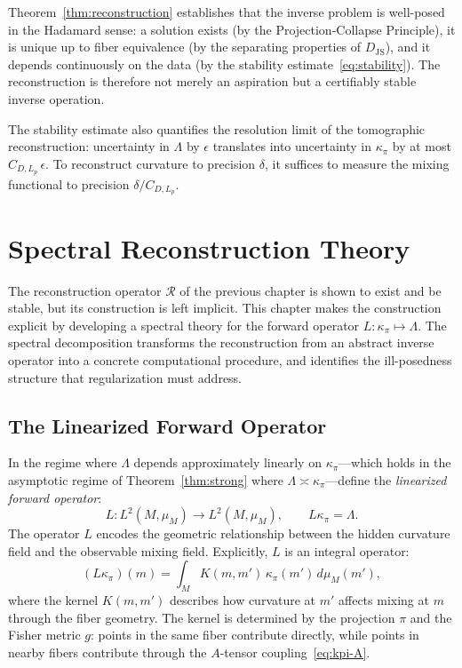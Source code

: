 \documentclass[12pt, oneside]{book}
\theoremstyle{plain-flyxion}
\theoremstyle{definition-flyxion}
\newcommand{\kpi}{\kappa_{\pi}}
\newcommand{\Lam}{\Lambda}
\begin{document}
Theorem~\ref{thm:reconstruction} establishes that the inverse problem is well-posed in
the Hadamard sense: a solution exists (by the Projection-Collapse Principle), it is
unique up to fiber equivalence (by the separating properties of $D_{\mathrm{JS}}$), and
it depends continuously on the data (by the stability estimate~\eqref{eq:stability}).
The reconstruction is therefore not merely an aspiration but a certifiably stable inverse
operation.

The stability estimate also quantifies the resolution limit of the tomographic
reconstruction: uncertainty in $\Lam$ by $\epsilon$ translates into uncertainty in $\kpi$
by at most $C_{D,L_p}\,\epsilon$. To reconstruct curvature to precision $\delta$, it
suffices to measure the mixing functional to precision $\delta / C_{D,L_p}$.

\chapter{Spectral Reconstruction Theory}

The reconstruction operator $\mathcal{R}$ of the previous chapter is shown to exist and
be stable, but its construction is left implicit. This chapter makes the construction
explicit by developing a spectral theory for the forward operator $L: \kpi \mapsto \Lam$.
The spectral decomposition transforms the reconstruction from an abstract inverse operator
into a concrete computational procedure, and identifies the ill-posedness structure that
regularization must address.

\section{The Linearized Forward Operator}

In the regime where $\Lam$ depends approximately linearly on $\kpi$---which holds in the
asymptotic regime of Theorem~\ref{thm:strong} where $\Lam \asymp \kpi$---define the
\emph{linearized forward operator}:
\begin{equation}\label{eq:forward-op}
L: L^2(M, \mu_M) \to L^2(M, \mu_M), \qquad L\kpi = \Lam.
\end{equation}
The operator $L$ encodes the geometric relationship between the hidden curvature field
and the observable mixing field. Explicitly, $L$ is an integral operator:
\begin{equation}\label{eq:forward-kernel}
(L\kpi)(m) = \int_M K(m, m')\, \kpi(m')\, d\mu_M(m'),
\end{equation}
where the kernel $K(m, m')$ describes how curvature at $m'$ affects mixing at $m$ through
the fiber geometry. The kernel is determined by the projection $\pi$ and the Fisher metric
$g$: points in the same fiber contribute directly, while points in nearby fibers contribute
through the $A$-tensor coupling~\eqref{eq:kpi-A}.
\end{document}
